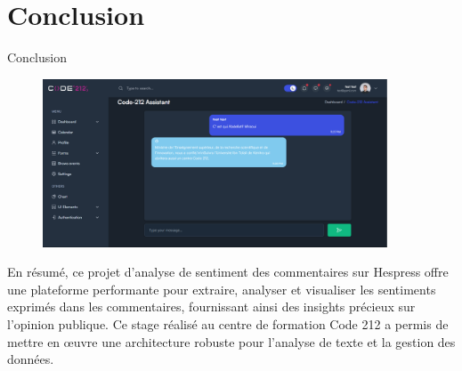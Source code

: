 \section{Conclusion}

\begin{frame}{Conclusion}
    \begin{figure}[H]
        \centering
        \includegraphics[height=5cm]{assets/images/chat1.png}
    \end{figure}
    En résumé, ce projet d'analyse de sentiment des commentaires sur Hespress offre une plateforme performante pour extraire, analyser et visualiser les sentiments exprimés dans les commentaires, fournissant ainsi des insights précieux sur l'opinion publique. Ce stage réalisé au centre de formation Code 212 a permis de mettre en œuvre une architecture robuste pour l'analyse de texte et la gestion des données.
\end{frame}


